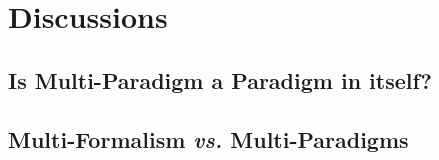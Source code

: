 \section{Discussions}
\label{sec:Discussions}

\subsection{Is Multi-Paradigm a Paradigm in itself?}
\label{sec:Discussion-Multiparadigm}

\subsection{Multi-Formalism \emph{vs.} Multi-Paradigms}
\label{sec:Discussion-MFvsMP}
